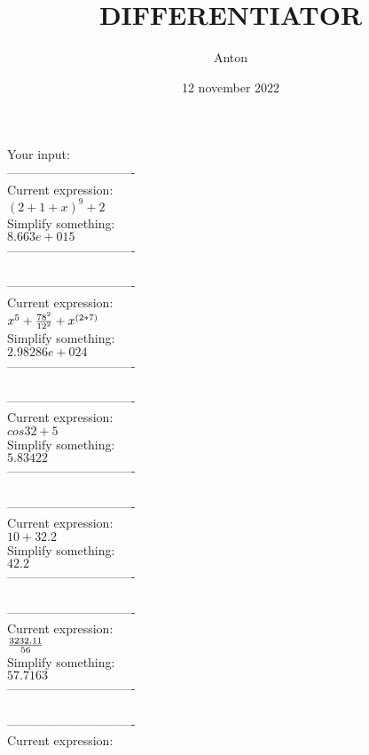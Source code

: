 \documentclass[12pt]{article}
\title{DIFFERENTIATOR}
\author{Anton}
\date{12 november 2022}
\begin{document}
    \maketitle
    Your input: \\
    
-------------------------------\\
Current expression:\\
\( {{(2+1+x)}^{9}}+2\) \\
Simplify something:\\
\( 8.663e+015\) \\
-------------------------------\\
\\
-------------------------------\\
Current expression:\\
\( {{x}^{5}}+{{{{78}^{2}}}\over{{{12}^{2}}}}+{{x}^{(2*7)}}\) \\
Simplify something:\\
\( 2.98286e+024\) \\
-------------------------------\\
\\
-------------------------------\\
Current expression:\\
\( cos32+5\) \\
Simplify something:\\
\( 5.83422\) \\
-------------------------------\\
\\
-------------------------------\\
Current expression:\\
\( 10+32.2\) \\
Simplify something:\\
\( 42.2\) \\
-------------------------------\\
\\
-------------------------------\\
Current expression:\\
\( {{3232.11}\over{56}}\) \\
Simplify something:\\
\( 57.7163\) \\
-------------------------------\\
\\
-------------------------------\\
Current expression:\\
\end{document}
